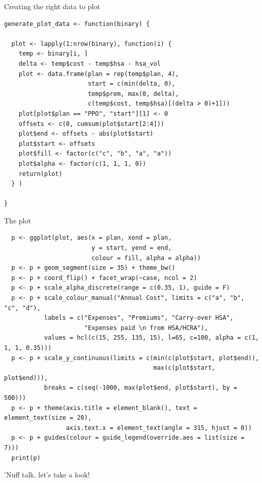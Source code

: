 \documentclass[sans,aspectratio=169,presentation,bigger,fleqn]{beamer}
\begin{document}
\begin{frame}[fragile,label=sec-25]{Creating the right data to plot}
 \tiny
\begin{verbatim}
generate_plot_data <- function(binary) {
            
  plot <- lapply(1:nrow(binary), function(i) {
    temp <- binary[i, ]
    delta <- temp$cost - temp$hsa - hsa_vol
    plot <- data.frame(plan = rep(temp$plan, 4),
                       start = c(min(delta, 0),
                       temp$prem, max(0, delta),
                       c(temp$cost, temp$hsa)[(delta > 0)+1]))
    plot[plot$plan == "PPO", "start"][1] <- 0
    offsets <- c(0, cumsum(plot$start[2:4]))
    plot$end <- offsets - abs(plot$start)
    plot$start <- offsets
    plot$fill <- factor(c("c", "b", "a", "a"))
    plot$alpha <- factor(c(1, 1, 1, 0))
    return(plot)
  } )
            
}
\end{verbatim}
\end{frame}
\begin{frame}[fragile,label=sec-26]{The plot}
 \tiny
\begin{verbatim}
  p <- ggplot(plot, aes(x = plan, xend = plan,
                        y = start, yend = end,
                        colour = fill, alpha = alpha))
  p <- p + geom_segment(size = 35) + theme_bw()
  p <- p + coord_flip() + facet_wrap(~case, ncol = 2)
  p <- p + scale_alpha_discrete(range = c(0.35, 1), guide = F)
  p <- p + scale_colour_manual("Annual Cost", limits = c("a", "b", "c", "d"),
           labels = c("Expenses", "Premiums", "Carry-over HSA",
                      "Expenses paid \n from HSA/HCRA"),
           values = hcl(c(15, 255, 135, 15), l=65, c=100, alpha = c(1, 1, 1, 0.35)))
  p <- p + scale_y_continuous(limits = c(min(c(plot$start, plot$end)),
                                         max(c(plot$start, plot$end))),
           breaks = c(seq(-1000, max(plot$end, plot$start), by = 500)))
  p <- p + theme(axis.title = element_blank(), text = element_text(size = 20),
                 axis.text.x = element_text(angle = 315, hjust = 0))
  p <- p + guides(colour = guide_legend(override.aes = list(size = 7)))
  print(p)
\end{verbatim}
\normalsize
\end{frame}
\begin{frame}[label=sec-27]{}
\vfill
\begin{center}
'Nuff talk, let's take a look!
\end{center}
\vfill
\end{frame}
\end{document}
